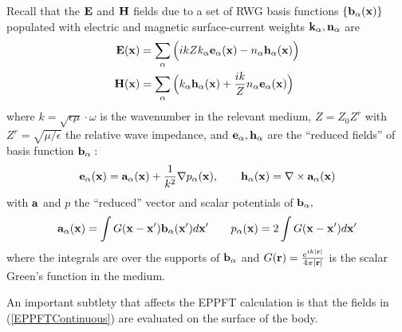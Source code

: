 Recall that the $\mathbf{E}$ and $\mathbf{H}$ fields due to a set of
RWG basis functions $\{\mathbf{b}_\alpha(\mathbf{x})\}$ populated
with electric and magnetic surface-current weights 
$\mathbf{k}_\alpha, \mathbf{n}_\alpha$ are 
\begin{align*}
\mathbf{E}(\mathbf{x}) 
 &= \sum_{\alpha} \Big( ikZ k_\alpha \mathbf{e}_\alpha(\mathbf{x})
                        -n_\alpha \mathbf{h}_\alpha(\mathbf{x})
                  \Big)
\\
\mathbf{H}(\mathbf{x}) 
 &= \sum_{\alpha} \Big( k_\alpha \mathbf{h}_\alpha(\mathbf{x})
                        +\frac{ik}{Z} n_\alpha \mathbf{e}_\alpha(\mathbf{x})
                  \Big)
\end{align*}
where $k=\sqrt{\epsilon \mu}\cdot \omega$ is the wavenumber in the relevant
medium, $Z=Z_0Z^r$ with $Z^r=\sqrt{\mu/\epsilon}$ the relative wave impedance,
and $\mathbf{e}_\alpha, \mathbf{h}_\alpha$ are the ``reduced fields'' of basis
function $\mathbf{b}_\alpha:$
$$
 \mathbf{e}_\alpha(\mathbf{x}) = \mathbf{a}_\alpha(\mathbf{x}) + \frac{1}{k^2}\nabla p_\alpha(\mathbf{x}),
 \qquad
 \mathbf{h}_\alpha(\mathbf{x}) = \nabla \times \mathbf{a}_\alpha(\mathbf{x})
$$
with $\mathbf{a}$ and $p$ the ``reduced'' vector and scalar potentials
of $\mathbf{b}_\alpha,$
$$
 \mathbf{a}_\alpha(\mathbf{x}) 
 = 
 \int G(\mathbf{x}-\mathbf{x}^\prime) \mathbf{b}_\alpha(\mathbf{x}^\prime) d\mathbf{x}^\prime 
\qquad
 p_\alpha(\mathbf{x}) 
 = 2\int G(\mathbf{x}-\mathbf{x}^\prime) d\mathbf{x}^\prime 
$$
where the integrals are over the supports of $\mathbf{b}_\alpha$
and $G(\mathbf{r})=\frac{e^{ik|\mathbf{r}|}}{4\pi|\mathbf{r}|}$ is the 
scalar Green's function in the medium.

An important subtlety that affects the EPPFT calculation is
that the fields in (\ref{EPPFTContinuous}) are evaluated
on the surface of the body.

